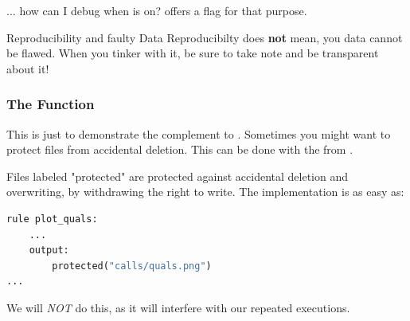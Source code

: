 \begin{frame}[fragile]
    $\ldots$ how can I debug when  is on?
    \pause
    \vfill
    \Snakemake offers a  flag for that purpose.
    \vfill
    \pause
    \begin{alertblock}{Reproducibility and faulty Data}
        Reproducibilty does \textbf{not} mean, you data cannot be flawed. When you tinker with it, be sure to take note and be transparent about it!
    \end{alertblock}
\end{frame}


\begin{frame}[fragile]
    \frametitle{The  Function}
    \begin{hint}
        This is just to demonstrate the complement to . Sometimes you might want to protect files from accidental deletion. This can be done with the  from \Snakemake.
    \end{hint}
    \pause
    Files labeled "protected" are protected against accidental deletion and overwriting, by withdrawing the right to write. The implementation is as easy as:
    \begin{lstlisting}[language=Python,style=Python]
rule plot_quals:
    ...
    output: 
        protected("calls/quals.png")
...
    \end{lstlisting}
    \pause
    \begin{hint}
        We will \emph{NOT} do this, as it will interfere with our repeated executions.
    \end{hint}	
\end{frame} 